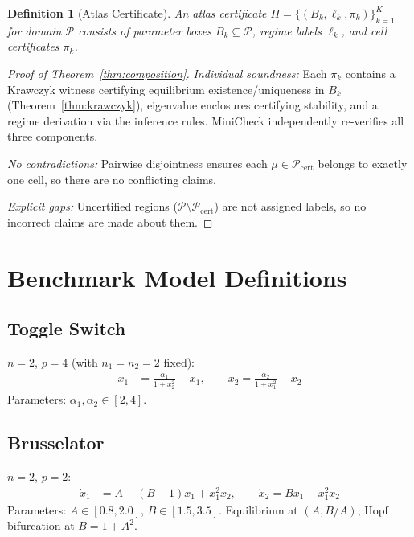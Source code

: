 \documentclass[11pt]{article}
\newtheorem{definition}[theorem]{Definition}
\begin{document}
\begin{definition}[Atlas Certificate]
An atlas certificate $\Pi = \{(B_k, \ell_k, \pi_k)\}_{k=1}^K$ for domain $\mathcal{P}$ consists of parameter boxes $B_k \subseteq \mathcal{P}$, regime labels $\ell_k$, and cell certificates $\pi_k$.
\end{definition}

\begin{proof}[Proof of Theorem~\ref{thm:composition}]
\emph{Individual soundness:} Each $\pi_k$ contains a Krawczyk witness certifying equilibrium existence/uniqueness in $B_k$ (Theorem~\ref{thm:krawczyk}), eigenvalue enclosures certifying stability, and a regime derivation via the inference rules.
MiniCheck independently re-verifies all three components.

\emph{No contradictions:} Pairwise disjointness ensures each $\mu \in \mathcal{P}_{\mathrm{cert}}$ belongs to exactly one cell, so there are no conflicting claims.

\emph{Explicit gaps:} Uncertified regions ($\mathcal{P} \setminus \mathcal{P}_{\mathrm{cert}}$) are not assigned labels, so no incorrect claims are made about them.
\end{proof}

\section{Benchmark Model Definitions}
\label{app:models}

\subsection{Toggle Switch~\cite{gardner2000toggle}}

$n=2$, $p=4$ (with $n_1{=}n_2{=}2$ fixed):
\begin{align*}
\dot{x}_1 &= \frac{\alpha_1}{1 + x_2^2} - x_1, \qquad
\dot{x}_2 = \frac{\alpha_2}{1 + x_1^2} - x_2
\end{align*}
Parameters: $\alpha_1, \alpha_2 \in [2, 4]$.

\subsection{Brusselator}

$n=2$, $p=2$:
\begin{align*}
\dot{x}_1 &= A - (B+1)x_1 + x_1^2 x_2, \qquad
\dot{x}_2 = Bx_1 - x_1^2 x_2
\end{align*}
Parameters: $A \in [0.8, 2.0]$, $B \in [1.5, 3.5]$.
Equilibrium at $(A, B/A)$; Hopf bifurcation at $B = 1 + A^2$.
\end{document}

